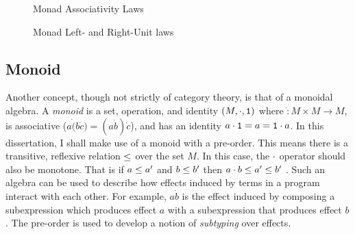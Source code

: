 \documentclass{Report}
\begin{document}
\begin{figure}
\begin{framed}  
        \centering
        \begin{minipage}{0.45\textwidth}
            \centering
            \caption{Monad Associativity Laws}
            \label{MonadAssociativity}
        \end{minipage}\hfill
        \begin{minipage}{0.45\textwidth}
            \centering
            \caption{Monad Left- and Right-Unit laws}
            \label{MonadUnits}
        \end{minipage}
\end{framed}
\end{figure}


\subsection{Monoid}

Another concept, though not strictly of category theory, is that of a monoidal algebra. A \textit{monoid} is a set, operation, and identity $(M, \dot, \1)$ where $\dot: M\times M \rightarrow M$, is associative ($a\dot(b\dot c) = (a\dot b)\dot c$), and has an identity $a\dot\1 = a = \1\dot a$. In this dissertation, I shall make use of a monoid with a pre-order. This means there is a transitive, reflexive relation $\subeffect$ over the set $M$. In this case, the $\dot$ operator should also be monotone. That is if $a \subeffect a'$ and $b\subeffect b'$ then $a\dot b \subeffect a'\subeffect b'$ . Such an algebra can be used to describe how effects induced by terms in a program interact with each other. For example, $a \dot b$ is the effect induced by composing a subexpression which produces effect $a$ with a subexpression that produces effect $b$. The pre-order is used to develop a notion of \textit{subtyping} over effects.
\end{document}
